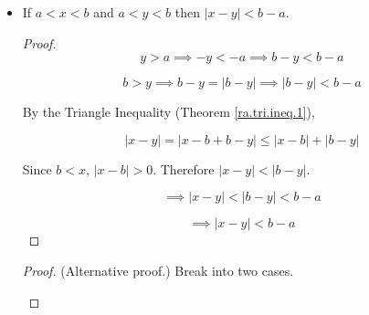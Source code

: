 \begin{itemize}
\begin{proof}
The right half of  (\ref{ra.proof.eqn1}) is also true by the Triangle Inequality (Theorem \ref{ra.tri.ineq.1}):

\[
|a| = |b + a - b| \leq |b| + |a - b|
\]

Therefore

\[
|\ |a| - |b| \ | \leq |a - b|.
\] \end{proof}

\begin{proof}(Alternative proof.) Note that by the Triangle Inequality (Theorem \ref{ra.tri.ineq.1}),

\[
|a| = |a - b +b| \leq |a - b| + |b| \implies |a| - |b| \leq |a - b|
\]

Also,

\[
|b| = |b - a + a| \leq |b - a| + |a| \implies -|b - a| \leq |a| - |b| \implies -|a - b| \leq |a| - |b|
\]

where the last step follows from Proposition \ref{ra.abs.fact.a}. Therefore

\[
-|a - b| \leq |a| - |b| \leq |a - b|
\]

and by Proposition \ref{ra.abs.fact1},

\[
|\ |a| - |b| \ | \leq |a - b|.
\]
\end{proof}

\item \begin{proposition} If \(a < x < b\) and \(a < y < b\) then \(|x - y| < b - a\). \end{proposition}

\begin{proof}
\[
y > a \implies -y < -a \implies b - y < b - a
\]

\[
b > y \implies b - y = |b - y| \implies  \boxed{|b - y| < b - a}
\]

By the Triangle Inequality (Theorem \ref{ra.tri.ineq.1}),

\[
|x - y| = |x - b + b - y| \leq |x -b| + |b - y|
\]

Since \(b <x\), \(|x - b| > 0\). Therefore \(\boxed{|x - y| < | b - y|}\).

\[
\implies |x - y| < |b - y| < b - a
\]

\[
\implies |x - y| < b - a
\]
\end{proof}

\begin{proof} (Alternative proof.) Break into two cases.

\begin{itemize}


\end{itemize}
\end{proof}
\end{itemize}
